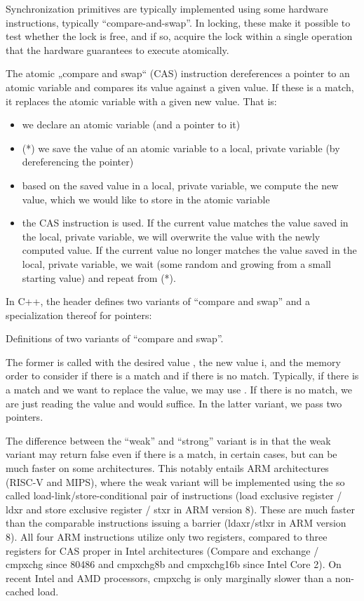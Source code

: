 Synchronization primitives are typically implemented using some hardware instructions, typically ``compare-and-swap''. In locking, these make it possible to test whether the lock is free, and if so, acquire the lock within a single operation that the hardware guarantees to execute atomically.

The atomic „compare and swap“ (CAS) instruction dereferences a pointer to an atomic variable and compares its value against a given value. If these is a match, it replaces the atomic variable with a given new value. That is:
\begin{itemize}
\item we declare an atomic variable (and a pointer to it)
\item (*) we save the value of an atomic variable to a local, private variable (by dereferencing the pointer)
\item based on the saved value in a local, private variable, we compute the new value, which we would like to store in the atomic variable
\item the CAS instruction is used. If the current value matches the value saved in the local, private variable, we will overwrite the value with the newly computed value. If the current value no longer matches the value saved in the local, private variable, we wait (some random and growing from a small starting value) and repeat from (*). 
\end{itemize}

In C++, the  header defines two variants of ``compare and swap'' and a specialization thereof for pointers:

\raggedbottom
\begin{codebox}[]{\href{https://godbolt.org/z/jGb1PxoxY}{\ExternalLink}}
\footnotesize Definitions of two variants of ``compare and swap''.
\tcblower
{}
\end{codebox}

The former is called with the desired value , the new value {i}, and the memory order to consider if there is a match and if there is no match. Typically, if there is a match and we want to replace the value, we may use . If there is no match, we are just reading the value and  would suffice. In the latter variant, we pass two pointers. 

The difference between the ``weak'' and ``strong'' variant is in that the weak variant may return false even if there is a match, in certain cases, but can be much faster on some architectures. This notably entails ARM architectures (RISC-V and MIPS), where the weak variant will be implemented using the so called load-link/store-conditional pair of instructions (load exclusive register / ldxr and store exclusive register / stxr in ARM version 8).
These are much faster than the comparable instructions issuing a barrier (ldaxr/stlxr in ARM version 8).
All four ARM instructions utilize only two registers, compared to three registers for CAS proper in Intel architectures (Compare and exchange / cmpxchg since 80486 and cmpxchg8b and cmpxchg16b since Intel Core 2). On recent Intel and AMD processors, cmpxchg is only marginally slower than a non-cached load.

